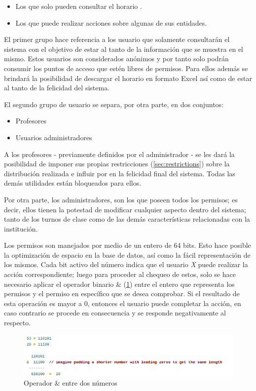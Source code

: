 \begin{itemize}
	\item Los que solo pueden consultar el horario .
	\item Los que puede realizar acciones sobre algunas de sus entidades.
\end{itemize}

El primer grupo hace referencia a los usuario que solamente consultarán el sistema con el objetivo de estar al tanto de la información que se muestra en el mismo. Estos usuarios son considerados anónimos y por tanto solo podrán consumir los puntos de acceso que estén libres de permisos. Para ellos además se brindará la posibilidad de descargar el horario en formato Excel así como de estar al tanto de la felicidad del sistema.

El segundo grupo de usuario se separa, por otra parte, en dos conjuntos:

\begin{itemize}
	\item Profesores
	\item Usuarios administradores
\end{itemize}

A los profesores - previamente definidos por el administrador - se les dará la posibilidad de imponer sus propias restricciones (\ref{sec:restrictions}) sobre la distribución realizada e influir por en la felicidad final del sistema. Todas las demás utilidades están bloqueados para ellos.

Por otra parte, los administradores, son los que poseen todos los permisos; es decir, ellos tienen la potestad de modificar cualquier aspecto dentro del sistema; tanto de los turnos de clase como de las demás características relacionadas con la institución.

Los permisos son manejados por medio de un entero de 64 bits. Esto hace posible la optimización de espacio en la base de datos, así como la fácil representación de los mismos. Cada bit activo del número indica que el usuario \textit{X} puede realizar la acción correspondiente; luego para proceder al chequeo de estos, solo se hace necesario aplicar el operador binario \& (\ref{fig:and}) entre el entero que representa los permisos y el permiso en específico que se desea comprobar. Si el resultado de esta operación es mayor a 0, entonces el usuario puede completar la acción, en caso contrario se procede en consecuencia  y se responde negativamente al respecto.

\begin{figure}[h!]
	\centering
	\includegraphics[width=0.95\linewidth]{images/Chapter 3/and}
	\caption{Operador \& entre dos números \cite{codeforces}}
	\label{fig:and}
\end{figure}

